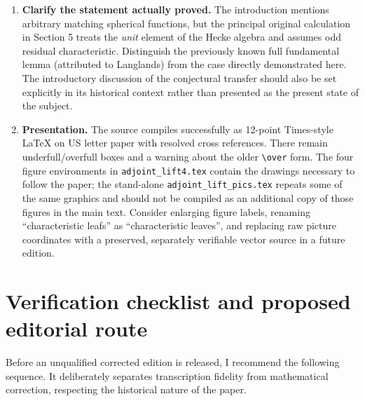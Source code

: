 \documentclass[12pt,letterpaper]{article}
\begin{document}
\begin{enumerate}[label=\arabic*.]
\item \textbf{Clarify the statement actually proved.} The introduction
mentions arbitrary matching spherical functions, but the principal
original calculation in Section 5 treats the \emph{unit} element of the
Hecke algebra and assumes odd residual characteristic. Distinguish
the previously known full fundamental lemma (attributed to Langlands)
from the case directly demonstrated here. The introductory discussion
of the conjectural transfer should also be set explicitly in its
historical context rather than presented as the present state of the
subject.

\item \textbf{Presentation.} The source compiles successfully as
12-point Times-style \LaTeX{} on US letter paper with resolved cross
references. There remain underfull/overfull boxes and a warning about
the older \verb|\over| form. The four figure environments in
\texttt{adjoint\_lift4.tex} contain the drawings necessary to follow
the paper; the stand-alone \texttt{adjoint\_lift\_pics.tex} repeats
some of the same graphics and should not be compiled as an additional
copy of those figures in the main text. Consider enlarging figure labels,
renaming ``characteristic leafs'' as ``characteristic leaves'', and
replacing raw picture coordinates with a preserved, separately
verifiable vector source in a future edition.
\end{enumerate}

\section{Verification checklist and proposed editorial route}

Before an unqualified corrected edition is released, I recommend the
following sequence. It deliberately separates transcription fidelity
from mathematical correction, respecting the historical nature of the
paper.
\end{document}
